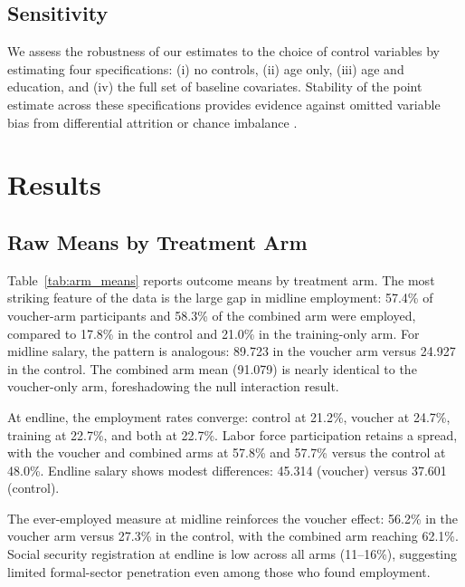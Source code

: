 \documentclass[12pt]{article}
\begin{document}
\subsection{Sensitivity}

We assess the robustness of our estimates to the choice of control variables by estimating four specifications: (i) no controls, (ii) age only, (iii) age and education, and (iv) the full set of baseline covariates. Stability of the point estimate across these specifications provides evidence against omitted variable bias from differential attrition or chance imbalance \citep{lin2013agnostic}.


\section{Results}\label{sec:results}

\subsection{Raw Means by Treatment Arm}

Table~\ref{tab:arm_means} reports outcome means by treatment arm. The most striking feature of the data is the large gap in midline employment: 57.4\% of voucher-arm participants and 58.3\% of the combined arm were employed, compared to 17.8\% in the control and 21.0\% in the training-only arm. For midline salary, the pattern is analogous: 89.723 in the voucher arm versus 24.927 in the control. The combined arm mean (91.079) is nearly identical to the voucher-only arm, foreshadowing the null interaction result.

At endline, the employment rates converge: control at 21.2\%, voucher at 24.7\%, training at 22.7\%, and both at 22.7\%. Labor force participation retains a spread, with the voucher and combined arms at 57.8\% and 57.7\% versus the control at 48.0\%. Endline salary shows modest differences: 45.314 (voucher) versus 37.601 (control).

The ever-employed measure at midline reinforces the voucher effect: 56.2\% in the voucher arm versus 27.3\% in the control, with the combined arm reaching 62.1\%. Social security registration at endline is low across all arms (11--16\%), suggesting limited formal-sector penetration even among those who found employment.
\end{document}
